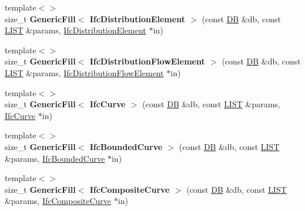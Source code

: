\begin{DoxyCompactItemize}
\item 
\hypertarget{namespace_assimp_1_1_s_t_e_p_aebcf2075673633f2dd20f116bc4edc22}{{\footnotesize template$<$$>$ }\\size\+\_\+t {\bfseries Generic\+Fill$<$ Ifc\+Distribution\+Element $>$} (const \hyperlink{class_assimp_1_1_s_t_e_p_1_1_d_b}{D\+B} \&db, const \hyperlink{class_assimp_1_1_s_t_e_p_1_1_e_x_p_r_e_s_s_1_1_l_i_s_t}{L\+I\+S\+T} \&params, \hyperlink{struct_assimp_1_1_i_f_c_1_1_ifc_distribution_element}{Ifc\+Distribution\+Element} $\ast$in)}\label{namespace_assimp_1_1_s_t_e_p_aebcf2075673633f2dd20f116bc4edc22}

\item 
\hypertarget{namespace_assimp_1_1_s_t_e_p_aecb6804c35d1fc207dfa54d0c983124f}{{\footnotesize template$<$$>$ }\\size\+\_\+t {\bfseries Generic\+Fill$<$ Ifc\+Distribution\+Flow\+Element $>$} (const \hyperlink{class_assimp_1_1_s_t_e_p_1_1_d_b}{D\+B} \&db, const \hyperlink{class_assimp_1_1_s_t_e_p_1_1_e_x_p_r_e_s_s_1_1_l_i_s_t}{L\+I\+S\+T} \&params, \hyperlink{struct_assimp_1_1_i_f_c_1_1_ifc_distribution_flow_element}{Ifc\+Distribution\+Flow\+Element} $\ast$in)}\label{namespace_assimp_1_1_s_t_e_p_aecb6804c35d1fc207dfa54d0c983124f}

\item 
\hypertarget{namespace_assimp_1_1_s_t_e_p_a3eb98b5a64b396d4fedf048fa11d5ff6}{{\footnotesize template$<$$>$ }\\size\+\_\+t {\bfseries Generic\+Fill$<$ Ifc\+Curve $>$} (const \hyperlink{class_assimp_1_1_s_t_e_p_1_1_d_b}{D\+B} \&db, const \hyperlink{class_assimp_1_1_s_t_e_p_1_1_e_x_p_r_e_s_s_1_1_l_i_s_t}{L\+I\+S\+T} \&params, \hyperlink{struct_assimp_1_1_i_f_c_1_1_ifc_curve}{Ifc\+Curve} $\ast$in)}\label{namespace_assimp_1_1_s_t_e_p_a3eb98b5a64b396d4fedf048fa11d5ff6}

\item 
\hypertarget{namespace_assimp_1_1_s_t_e_p_a533b55bc27bef144d37fa1e79908f3e8}{{\footnotesize template$<$$>$ }\\size\+\_\+t {\bfseries Generic\+Fill$<$ Ifc\+Bounded\+Curve $>$} (const \hyperlink{class_assimp_1_1_s_t_e_p_1_1_d_b}{D\+B} \&db, const \hyperlink{class_assimp_1_1_s_t_e_p_1_1_e_x_p_r_e_s_s_1_1_l_i_s_t}{L\+I\+S\+T} \&params, \hyperlink{struct_assimp_1_1_i_f_c_1_1_ifc_bounded_curve}{Ifc\+Bounded\+Curve} $\ast$in)}\label{namespace_assimp_1_1_s_t_e_p_a533b55bc27bef144d37fa1e79908f3e8}

\item 
\hypertarget{namespace_assimp_1_1_s_t_e_p_aa65dbaeda40caddb2c24b55c10330648}{{\footnotesize template$<$$>$ }\\size\+\_\+t {\bfseries Generic\+Fill$<$ Ifc\+Composite\+Curve $>$} (const \hyperlink{class_assimp_1_1_s_t_e_p_1_1_d_b}{D\+B} \&db, const \hyperlink{class_assimp_1_1_s_t_e_p_1_1_e_x_p_r_e_s_s_1_1_l_i_s_t}{L\+I\+S\+T} \&params, \hyperlink{struct_assimp_1_1_i_f_c_1_1_ifc_composite_curve}{Ifc\+Composite\+Curve} $\ast$in)}\label{namespace_assimp_1_1_s_t_e_p_aa65dbaeda40caddb2c24b55c10330648}


\end{DoxyCompactItemize}
